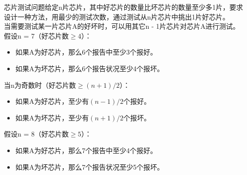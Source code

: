 \begin{table}[H]
    \centering
    \caption{测试结果}
\end{table}

芯片测试问题给定n片芯片，其中好芯片的数量比坏芯片的数量至少多1片，要求设计一种方法，用最少的测试次数，通过测试从n片芯片中挑出1片好芯片。 \\

当需要测试某一片芯片A的好坏时，可以用其它n - 1片芯片对芯片A进行测试。 \\

假设n = 7（好芯片数$ \ge 4 $）：

\begin{itemize}
    \item 如果A为好芯片，那么6个报告中至少3个报好。
    \item 如果A为坏芯片，那么6个报告状况至少4个报坏。
\end{itemize}

当n为奇数时（好芯片数$ \ge (n + 1) / 2 $）：

\begin{itemize}
    \item 如果A为好芯片，至少有$ (n-1) / 2 $个报好。
    \item 如果A为坏芯片，至少有$ (n+1) / 2 $个报坏。
\end{itemize}

假设n = 8（好芯片数$ \ge 5 $）：

\begin{itemize}
    \item 如果A为好芯片，那么7个报告中至少4个报好。
    \item 如果A为坏芯片，那么7个报告状况至少5个报坏。
\end{itemize}

